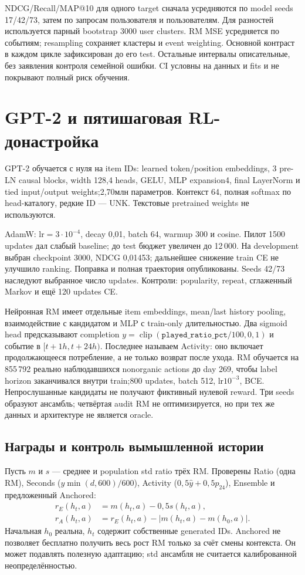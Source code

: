 \documentclass[10pt,a4paper,twocolumn]{article}
\begin{document}
NDCG/Recall/MAP@10 для одного target сначала усредняются по model seeds
17/42/73, затем по запросам пользователя и пользователям. Для разностей
используется парный bootstrap 3000 user clusters. RM MSE усредняется
по событиям; resampling сохраняет кластеры и event weighting.
Основной контраст в каждом цикле зафиксирован до его test. Остальные
интервалы описательные, без заявления контроля семейной ошибки.
CI условны на данных и fits и не покрывают полный риск обучения.

\section{GPT-2 и пятишаговая RL-донастройка}

GPT-2 обучается с нуля на item IDs: learned token/position embeddings,
3 pre-LN causal blocks, width 128{,}4 heads, GELU, MLP expansion4,
final LayerNorm и tied input/output weights;2{,}70млн параметров.
Контекст 64, полная softmax по head-каталогу, редкие ID --- UNK.
Текстовые pretrained weights не используются.

AdamW: lr$=3\cdot10^{-4}$, decay 0{,}01, batch 64, warmup 300 и cosine.
Пилот 1500 updates дал слабый baseline; до test бюджет увеличен до 12\,000.
На development выбран checkpoint 3000, NDCG 0{,}01453; дальнейшее снижение
train CE не улучшило ranking. Поправка и полная траектория опубликованы.
Seeds 42/73 наследуют выбранное число updates. Контроли: popularity,
repeat, сглаженный Markov и ещё 120 updates CE.

Нейронная RM имеет отдельные item embeddings, mean/last history pooling,
взаимодействие с кандидатом и MLP с train-only длительностью.
Два sigmoid head предсказывают completion
$y=\operatorname{clip}(\texttt{played\_ratio\_pct}/100{,}0{,}1)$
и событие в $[t+1h,t+24h)$. Последнее называем Activity:
оно включает продолжающееся потребление, а не только возврат после ухода.
RM обучается на 855\,792 реально наблюдавшихся nonorganic actions до day 269,
чтобы label horizon заканчивался внутри train;800 updates, batch 512,
lr$10^{-3}$, BCE. Непрослушанные кандидаты не получают фиктивный нулевой reward.
Три seeds образуют ансамбль; четвёртая audit RM не оптимизируется, но
при тех же данных и архитектуре не является oracle.



\subsection{Награды и контроль вымышленной истории}
Пусть $m$ и $s$ --- среднее и population std ratio трёх RM.
Проверены Ratio (одна RM), Seconds
($\hat y\min(d,600)/600$), Activity ($0{,}5\hat y+0{,}5\hat p_{24}$),
Ensemble и предложенный Anchored:
\begin{align}
r_E(h_t,a)&=m(h_t,a)-0{,}5s(h_t,a),\\
r_A(h_t,a)&=r_E(h_t,a)-|m(h_t,a)-m(h_0,a)|.
\end{align}
Начальная $h_0$ реальна, $h_t$ содержит собственные generated IDs.
Anchored не позволяет бесплатно получить весь рост RM только за счёт
смены контекста. Он может подавлять полезную адаптацию; std ансамбля
не считается калиброванной неопределённостью.
\end{document}
